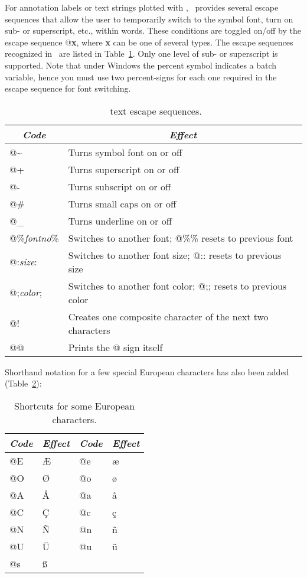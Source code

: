 For annotation labels or text strings plotted with ,
\GMT\ provides several escape sequences that allow the user to
temporarily switch to the symbol font, turn on sub- or superscript,
etc., within words.  These conditions are toggled on/off by the
escape sequence @\textbf{x}, where \textbf{x} can be one of several types.
The escape sequences recognized in \GMT\ are listed in Table~\ref{tbl:escape}. 
Only one level of sub- or superscript is supported.
Note that under Windows the percent symbol indicates a batch variable,
hence you must use two percent-signs for each one required in the escape sequence for font switching.

\begin{table}[H]
\centering
\begin{tabular}{|l|l|} \hline
\multicolumn{1}{|c|}{\emph{Code}}	&	\multicolumn{1}{c|}{\emph{Effect}} \\ \hline
@\~	&	Turns symbol font on or off \\ \hline 
@+	&	Turns superscript on or off \\ \hline 
@-	&	Turns subscript on or off \\ \hline 
@\#	&	Turns small caps on or off \\ \hline 
@\_	&	Turns underline on or off \\ \hline 
@\%\emph{fontno}\%	&	Switches to another font; @\%\% resets to previous font \\ \hline 
@:\emph{size}:	&	Switches to another font size; @:: resets to previous size \\ \hline 
@;\emph{color};	&	Switches to another font color; @;; resets to previous color \\ \hline 
@!	&	Creates one composite character of the next two characters \\ \hline 
@@	&	Prints the @ sign itself \\ \hline 
\end{tabular}
\caption{\gmt\ text escape sequences.}
\label{tbl:escape}
\end{table}

Shorthand notation for a few special European characters has also been
added (Table~\ref{tbl:scand}):

\begin{table}[H]
\centering
\begin{tabular}{|l|l||l|l|} \hline
\emph{Code} & \emph{Effect}  & \emph{Code} & \emph{Effect} \\ \hline
@E &  \AE   & @e &  \ae   \\ \hline
@O &  \O    & @o &  \o    \\ \hline
@A &  \AA   & @a &  \aa   \\ \hline
@C &  \c{C} & @c &  \c{c} \\ \hline
@N &  \~{N} & @n &  \~{n} \\ \hline
@U &  \"{U} & @u &  \"{u} \\ \hline
@s &  \ss   &    &        \\ \hline
\end{tabular}
\caption{Shortcuts for some European characters.}
\label{tbl:scand}
\end{table}

